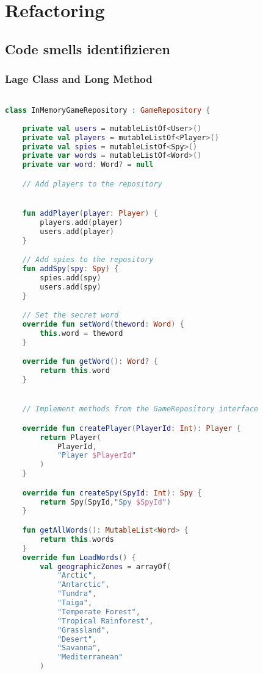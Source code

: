 \chapter{Refactoring}

\section{Code smells identifizieren}


\subsection*{Lage Class and Long Method}

\begin{lstlisting}[language=Kotlin, caption={Code Smell: Large Class and Long Method}, label={lst:5}]

class InMemoryGameRepository : GameRepository {
    
    private val users = mutableListOf<User>()
    private val players = mutableListOf<Player>()
    private val spies = mutableListOf<Spy>()
    private var words = mutableListOf<Word>()
    private var word: Word? = null

    // Add players to the repository


    fun addPlayer(player: Player) {
        players.add(player)
        users.add(player)
    }

    // Add spies to the repository
    fun addSpy(spy: Spy) {
        spies.add(spy)
        users.add(spy)
    }

    // Set the secret word
    override fun setWord(theword: Word) {
        this.word = theword
    }

    override fun getWord(): Word? {
        return this.word
    }


    // Implement methods from the GameRepository interface

    override fun createPlayer(PlayerId: Int): Player {
        return Player(
            PlayerId,
            "Player $PlayerId"
        )
    }

    override fun createSpy(SpyId: Int): Spy {
        return Spy(SpyId,"Spy $SpyId")
    }

    fun getAllWords(): MutableList<Word> {
        return this.words
    }
    override fun LoadWords() {
        val geographicZones = arrayOf(
            "Arctic",
            "Antarctic",
            "Tundra",
            "Taiga",
            "Temperate Forest",
            "Tropical Rainforest",
            "Grassland",
            "Desert",
            "Savanna",
            "Mediterranean"
        )


\end{lstlisting}

